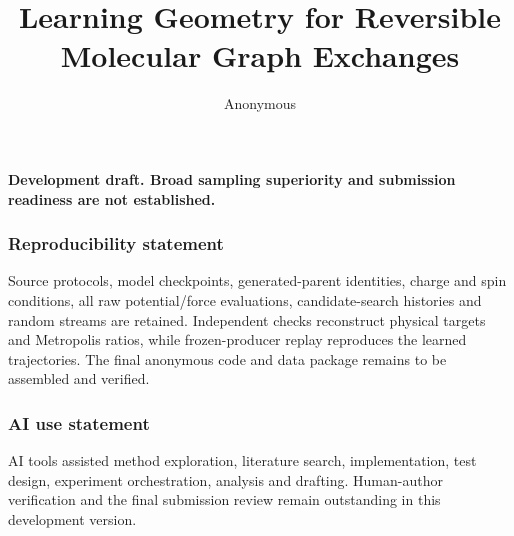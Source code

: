\documentclass{article}
\title{Learning Geometry for Reversible\\Molecular Graph Exchanges}
\author{Anonymous}
\begin{document}
\maketitle
\begin{center}\textbf{Development draft. Broad sampling superiority and submission readiness are not established.}\end{center}

\label{endofmaintext}
\subsubsection*{Reproducibility statement}
Source protocols, model checkpoints, generated-parent identities, charge and spin
conditions, all raw potential/force evaluations, candidate-search histories and
random streams are retained. Independent checks reconstruct physical targets and
Metropolis ratios, while frozen-producer replay reproduces the learned trajectories.
The final anonymous code and data package remains to be assembled and verified.
\subsubsection*{AI use statement}
AI tools assisted method exploration, literature search, implementation, test
design, experiment orchestration, analysis and drafting. Human-author verification
and the final submission review remain outstanding in this development version.


\appendix








\clearpage

\end{document}
